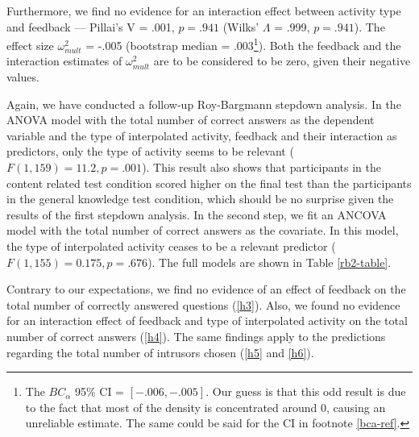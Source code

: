 \documentclass[../main.tex]{subfiles}
\begin{document}
Furthermore, we find no evidence for an interaction effect between
activity type and feedback --- Pillai's V = .001, \(p = .941\) (Wilks'
\(\Lambda\) = .999, \(p = .941\)). The effect size \(\omega^2_{mult}\) =
-.005 (bootstrap median = .003\footnote{
The \(BC_\alpha\) 95\% CI = \([-.006,
-.005]\).
Our guess is that this odd result is due to the fact that most of the density is concentrated
around 0, causing an unreliable estimate. The same could be said for the CI in
footnote \ref{bca-ref}.}). Both the feedback and the interaction
estimates of \(\omega^2_{mult}\) are to be considered to be zero, given
their negative values.

Again, we have conducted a follow-up Roy-Bargmann stepdown analysis. In
the ANOVA model with the total number of correct answers as the
dependent variable and the type of interpolated activity, feedback and
their interaction as predictors, only the type of activity seems to be
relevant (\(F(1, 159) = 11.2, p = .001\)). This result also shows that
participants in the content related test condition scored higher on the
final test than the participants in the general knowledge test
condition, which should be no surprise given the results of the first
stepdown analysis. In the second step, we fit an ANCOVA model with the
total number of correct answers as the covariate. In this model, the
type of interpolated activity ceases to be a relevant predictor
(\(F(1, 155) = 0.175, p = .676\)). The full models are shown in Table
\ref{rb2-table}.

Contrary to our expectations, we find no evidence of an effect of
feedback on the total number of correctly answered questions (\ref{h3}).
Also, we found no evidence for an interaction effect of feedback and
type of interpolated activity on the total number of correct answers
(\ref{h4}). The same findings apply to the predictions regarding the
total number of intrusors chosen (\ref{h5} and \ref{h6}).
\end{document}
